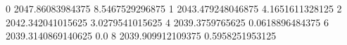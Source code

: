 0 2047.86083984375 8.5467529296875
1 2043.479248046875 4.1651611328125
2 2042.342041015625 3.0279541015625
4 2039.3759765625 0.0618896484375
6 2039.3140869140625 0.0
8 2039.909912109375 0.5958251953125
